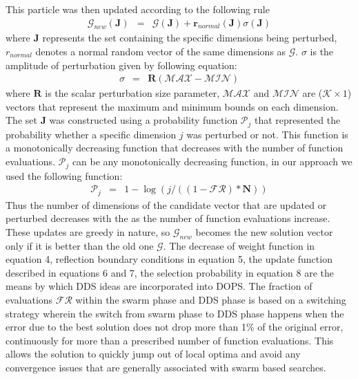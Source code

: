 \documentclass[12pt]{article}
\begin{document}
This particle was then updated according to the following rule
\begin{eqnarray}
	\mathcal{G}_{new}(\mathbf{J})& = &\mathcal{G}(\mathbf{J})+\mathbf{r}_{normal}(\mathbf{J})\sigma(\mathbf{J})
\end{eqnarray}
where $\mathbf{J}$ represents the set containing the specific dimensions being perturbed, ${r}_{normal}$ denotes a normal random vector of the same dimensions as $\mathcal{G}$. $\sigma$ is the amplitude of perturbation given by following equation:
\begin{eqnarray}
	\sigma& = &\mathbf{R}(\mathcal{MAX} -\mathcal{MIN})
\end{eqnarray}
where $\mathbf{R}$ is the scalar perturbation size parameter, $\mathcal{MAX}$ and $\mathcal{MIN}$ are ($\mathcal{K}\times{1}$) vectors that represent the maximum and minimum bounds on each dimension. The set $\mathbf{J}$ was constructed using a probability function $\mathcal{P}_{j}$ that represented the probability whether a specific dimension $j$ was perturbed or not.  This function is a monotonically decreasing function that decreases with the number of function evaluations. $\mathcal{P}_{j}$ can be any monotonically decreasing function, in our approach we used the following function:
\begin{eqnarray}
	\mathcal{P}_{j}&=&{1}-\log(j/ (({1}-\mathcal{FR})*\mathbf{N}))
\end{eqnarray}
Thus the number of dimensions of the candidate vector that are updated or perturbed decreases with the as the number of function evaluations increase. These updates are greedy in nature, so $\mathcal{G}_{new}$ becomes the new solution vector only if it is better than the old one $\mathcal{G}$. The decrease of weight function in equation 4, reflection boundary conditions in equation 5, the update function described in equations 6 and 7, the selection probability in equation 8 are the means by which DDS ideas are incorporated into DOPS.
The fraction of evaluations $\mathcal{FR}$  within the swarm phase and DDS phase is based on a switching strategy wherein the switch from swarm phase to DDS phase happens when the error due to the best solution does not drop more than 1\% of the original error, continuously for more than a prescribed number of function evaluations. This allows the solution to quickly jump out of local optima and avoid any convergence issues that are generally associated with swarm based searches. 
\end{document}
